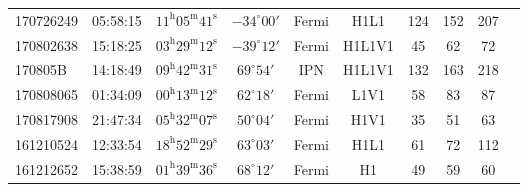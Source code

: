\documentclass[11pt]{cuthesis}
\begin{document}
\begin{landscape}
\begin{tabular}{l c  c  c  c  c  c  c  c c |}
170726249 & 05:58:15  & $11^{\mathrm{h}}05^{\mathrm{m}}41^{\mathrm{s}}$ & $-34^{\circ}00'$ & Fermi   & H1L1   & 124 & 152 & 207 \\
170802638 & 15:18:25  & $03^{\mathrm{h}}29^{\mathrm{m}}12^{\mathrm{s}}$ & $-39^{\circ}12'$ & Fermi   & H1L1V1 & 45  & 62  & 72 \\
170805B   & 14:18:49  & $09^{\mathrm{h}}42^{\mathrm{m}}31^{\mathrm{s}}$ & $69^{\circ}54'$ &  IPN     & H1L1V1 & 132 & 163 & 218 \\
170808065 & 01:34:09  & $00^{\mathrm{h}}13^{\mathrm{m}}12^{\mathrm{s}}$ & $62^{\circ}18'$ &  Fermi   & L1V1   & 58  & 83  & 87 \\
170817908 & 21:47:34  & $05^{\mathrm{h}}32^{\mathrm{m}}07^{\mathrm{s}}$ & $50^{\circ}04'$ &  Fermi   & H1V1   & 35  & 51  & 63 \\
161210524 & 12:33:54  & $18^{\mathrm{h}}52^{\mathrm{m}}29^{\mathrm{s}}$ & $63^{\circ}03'$ &  Fermi   & H1L1   & 61  & 72  & 112 \\
161212652 & 15:38:59  & $01^{\mathrm{h}}39^{\mathrm{m}}36^{\mathrm{s}}$ & $68^{\circ}12'$ &  Fermi   & H1     & 49  & 59  & 60 \\
\end{tabular}
\end{landscape}
\end{document}
